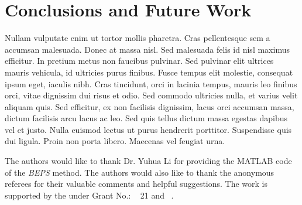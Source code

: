 \documentclass[acmtog]{acmart}
\begin{document}
\section{Conclusions and Future Work}

Nullam vulputate enim ut tortor mollis pharetra. Cras pellentesque sem a accumsan malesuada. Donec at massa nisl. Sed malesuada felis id nisl maximus efficitur. In pretium metus non faucibus pulvinar. Sed pulvinar elit ultrices mauris vehicula, id ultricies purus finibus. Fusce tempus elit molestie, consequat ipsum eget, iaculis nibh. Cras tincidunt, orci in lacinia tempus, mauris leo finibus orci, vitae dignissim dui risus et odio. Sed commodo ultricies nulla, et varius velit aliquam quis. Sed efficitur, ex non facilisis dignissim, lacus orci accumsan massa, dictum facilisis arcu lacus ac leo. Sed quis tellus dictum massa egestas dapibus vel et justo. Nulla euismod lectus ut purus hendrerit porttitor. Suspendisse quis dui ligula. Proin non porta libero. Maecenas vel feugiat urna.

\begin{acks}
The authors would like to thank Dr. Yuhua Li for providing the MATLAB code of the \textit{BEPS} method.
The authors would also like to thank the anonymous referees for their valuable comments and helpful suggestions. The work is supported by the  under Grant No.: ~
21 and ~.
\end{acks}



\end{document}
